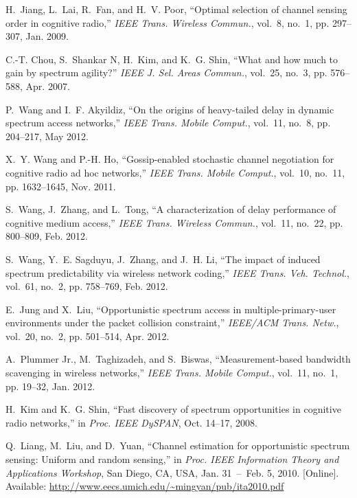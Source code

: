 \documentclass[11pt,draftclsnofoot,journal,onecolumn]{IEEEtran}
\begin{document}
\begin{thebibliography}{10}
H.~{Jiang}, L.~{Lai}, R.~{Fan}, and H.~V. {Poor}, ``Optimal selection of
  channel sensing order in cognitive radio,'' \emph{{IEEE} Trans. Wireless
  Commun.}, vol.~8, no.~1, pp. 297--307, Jan. 2009.

C.-T. {Chou}, S.~{Shankar N}, H.~{Kim}, and K.~G. {Shin}, ``What and how much
  to gain by spectrum agility?'' \emph{{IEEE} J. Sel. Areas Commun.}, vol.~25,
  no.~3, pp. 576--588, Apr. 2007.

P.~{Wang} and I.~F. {Akyildiz}, ``On the origins of heavy-tailed delay in
  dynamic spectrum access networks,'' \emph{{IEEE} Trans. Mobile Comput.},
  vol.~11, no.~8, pp. 204--217, May 2012.

X.~Y. {Wang} and P.-H. {Ho}, ``Gossip-enabled stochastic channel negotiation
  for cognitive radio ad hoc networks,'' \emph{{IEEE} Trans. Mobile Comput.},
  vol.~10, no.~11, pp. 1632--1645, Nov. 2011.

S.~{Wang}, J.~{Zhang}, and L.~{Tong}, ``A characterization of delay performance
  of cognitive medium access,'' \emph{{IEEE} Trans. Wireless Commun.}, vol.~11,
  no.~22, pp. 800--809, Feb. 2012.

S.~{Wang}, Y.~E. {Sagduyu}, J.~{Zhang}, and J.~H. {Li}, ``The impact of induced
  spectrum predictability via wireless network coding,'' \emph{{IEEE} Trans.
  Veh. Technol.}, vol.~61, no.~2, pp. 758--769, Feb. 2012.

E.~{Jung} and X.~{Liu}, ``Opportunistic spectrum access in
  multiple-primary-user environments under the packet collision constraint,''
  \emph{{IEEE/ACM} Trans. Netw.}, vol.~20, no.~2, pp. 501--514, Apr. 2012.

A.~{Plummer Jr.}, M.~{Taghizadeh}, and S.~{Biswas}, ``Measurement-based
  bandwidth scavenging in wireless networks,'' \emph{{IEEE} Trans. Mobile
  Comput.}, vol.~11, no.~1, pp. 19--32, Jan. 2012.

H.~{Kim} and K.~G. {Shin}, ``Fast discovery of spectrum opportunities in
  cognitive radio networks,'' in \emph{Proc. IEEE DySPAN}, Oct. 14--17, 2008.

\BIBentryALTinterwordspacing
Q.~{Liang}, M.~{Liu}, and D.~{Yuan}, ``Channel estimation for opportunistic
  spectrum sensing: Uniform and random sensing,'' in \emph{Proc. IEEE
  Information Theory and Applications Workshop}, San Diego, CA, USA, Jan.
  31~--~Feb. 5, 2010. [Online]. Available:
  \url{http://www.eecs.umich.edu/~mingyan/pub/ita2010.pdf}
\BIBentrySTDinterwordspacing


\end{thebibliography}
\end{document}
